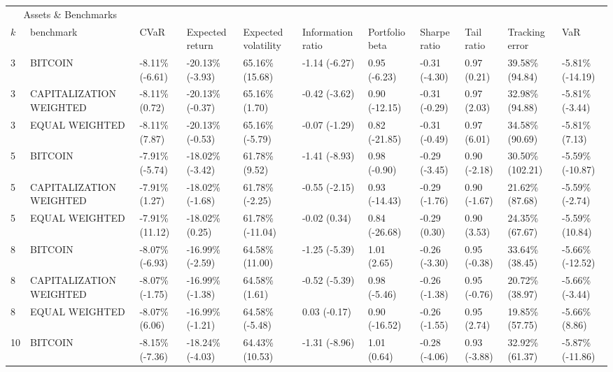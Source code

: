 \documentclass{article}
\begin{document}
\begin{landscape}
\begin{table}[H]
  \centering
  \begin{tabular}{p{0.4cm}|p{3cm}|p{1.65cm}|p{1.65cm}|p{1.65cm}|p{1.65cm}|p{1.65cm}|p{1.65cm}|p{1.65cm}|p{1.65cm}|p{1.65cm}}%
    \toprule
    \multicolumn{2}{c}{Assets \& Benchmarks}                   \\
    \cmidrule(r){1-2}
    $k$ & benchmark & CVaR & Expected return & Expected volatility&Information ratio&Portfolio beta&Sharpe ratio&Tail ratio&Tracking error&VaR\\
    \midrule
    3&BITCOIN&-8.11\% (-6.61)&-20.13\% (-3.93)&65.16\% (15.68)&-1.14 (-6.27)&0.95 (-6.23)&-0.31 (-4.30)&0.97 (0.21)&39.58\% (94.84)&-5.81\% (-14.19)
\\ 
3&CAPITALIZATION WEIGHTED&-8.11\% (0.72)&-20.13\% (-0.37)&65.16\% (1.70)&-0.42 (-3.62)&0.90 (-12.15)&-0.31 (-0.29)&0.97 (2.03)&32.98\% (94.88)&-5.81\% (-3.44)
\\ 
3&EQUAL WEIGHTED&-8.11\% (7.87)&-20.13\% (-0.53)&65.16\% (-5.79)&-0.07 (-1.29)&0.82 (-21.85)&-0.31 (-0.49)&0.97 (6.01)&34.58\% (90.69)&-5.81\% (7.13)
\\ 
5&BITCOIN&-7.91\% (-5.74)&-18.02\% (-3.42)&61.78\% (9.52)&-1.41 (-8.93)&0.98 (-0.90)&-0.29 (-3.45)&0.90 (-2.18)&30.50\% (102.21)&-5.59\% (-10.87)
\\ 
5&CAPITALIZATION WEIGHTED&-7.91\% (1.27)&-18.02\% (-1.68)&61.78\% (-2.25)&-0.55 (-2.15)&0.93 (-14.43)&-0.29 (-1.76)&0.90 (-1.67)&21.62\% (87.68)&-5.59\% (-2.74)
\\ 
5&EQUAL WEIGHTED&-7.91\% (11.12)&-18.02\% (0.25)&61.78\% (-11.04)&-0.02 (0.34)&0.84 (-26.68)&-0.29 (0.30)&0.90 (3.53)&24.35\% (67.67)&-5.59\% (10.84)
\\ 
8&BITCOIN&-8.07\% (-6.93)&-16.99\% (-2.59)&64.58\% (11.00)&-1.25 (-5.39)&1.01 (2.65)&-0.26 (-3.30)&0.95 (-0.38)&33.64\% (38.45)&-5.66\% (-12.52)
\\ 
8&CAPITALIZATION WEIGHTED&-8.07\% (-1.75)&-16.99\% (-1.38)&64.58\% (1.61)&-0.52 (-5.39)&0.98 (-5.46)&-0.26 (-1.38)&0.95 (-0.76)&20.72\% (38.97)&-5.66\% (-3.44)
\\ 
8&EQUAL WEIGHTED&-8.07\% (6.06)&-16.99\% (-1.21)&64.58\% (-5.48)&0.03 (-0.17)&0.90 (-16.52)&-0.26 (-1.55)&0.95 (2.74)&19.85\% (57.75)&-5.66\% (8.86)
\\ 
10&BITCOIN&-8.15\% (-7.36)&-18.24\% (-4.03)&64.43\% (10.53)&-1.31 (-8.96)&1.01 (0.64)&-0.28 (-4.06)&0.93 (-3.88)&32.92\% (61.37)&-5.87\% (-11.86)
\\ 

\end{tabular}
\end{table}
\end{landscape}
\end{document}
